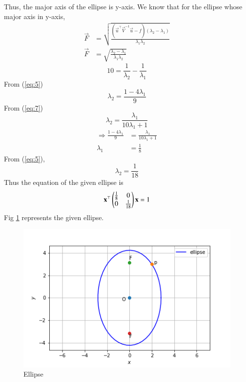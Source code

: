\documentclass[journal,12pt,twocolumn]{IEEEtran}
\begin{document}
Thus, the major axis of the ellipse is y-axis.
We know that for the ellipse whose major axis in y-axis,
\begin{align}
    \vec{F} &=\sqrt{\frac{ (\vec{u}^{\top} \vec{V}^{-1} \vec{u} - f)(\lambda_2-\lambda_1)}{\lambda_1\lambda_2}}\\
    \vec{F} &= \sqrt{\frac{\lambda_2-\lambda_1}{\lambda_1\lambda_2}}
\end{align}
\begin{equation}
     10=\frac{1}{\lambda_2}-\frac{1}{\lambda_1} \label{eq:7}
\end{equation}
From (\ref{eq:5})
\begin{equation}
    \lambda_2 = \frac{1-4\lambda_1 }{9}
\end{equation}
From (\ref{eq:7})
\begin{equation}
    \lambda_2 = \frac{\lambda_1 }{10\lambda_1 + 1}
\end{equation}
\begin{align}
  \Longrightarrow  \frac{1-4\lambda_1 }{9}&=\frac{\lambda_1 }{10\lambda_1 + 1}\\
  \lambda_1&=\frac{1}{8}
\end{align}
From (\ref{eq:5}),
\begin{equation}
    \lambda_2=\frac{1}{18}
\end{equation}
Thus the equation of the given ellipse is
\begin{equation}
    \mathbf{x}^{\top}\begin{pmatrix}\frac{1}{8}&0\\0&\frac{1}{18}\end{pmatrix}\mathbf{x} = 1
\end{equation}
Fig \ref{fig:1} represents the given ellipse.
\begin{figure}[H]
\centering
    \includegraphics[width= \columnwidth]{assignment6.png}
    \caption{Ellipse} \label{fig:1}
\end{figure}
\end{document}

